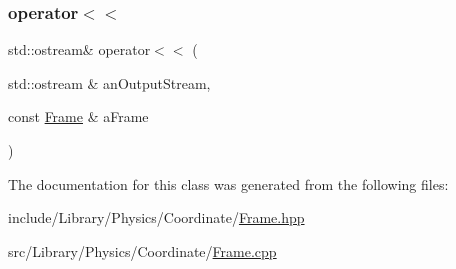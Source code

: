 \subsubsection{\texorpdfstring{operator$<$$<$}{operator<<}}
{\footnotesize\ttfamily std\+::ostream\& operator$<$$<$ (\begin{DoxyParamCaption}\item[{std\+::ostream \&}]{an\+Output\+Stream,  }\item[{const \hyperlink{classlibrary_1_1physics_1_1coord_1_1_frame}{Frame} \&}]{a\+Frame }\end{DoxyParamCaption})\hspace{0.3cm}{\ttfamily [friend]}}



The documentation for this class was generated from the following files\+:\begin{DoxyCompactItemize}
\item 
include/\+Library/\+Physics/\+Coordinate/\hyperlink{_frame_8hpp}{Frame.\+hpp}\item 
src/\+Library/\+Physics/\+Coordinate/\hyperlink{_frame_8cpp}{Frame.\+cpp}\end{DoxyCompactItemize}
